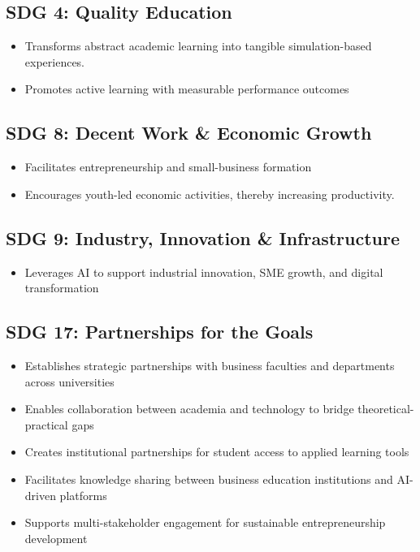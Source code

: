 \documentclass[12pt,letterpaper]{article}
\begin{document}
\subsection{SDG 4: Quality Education}
\begin{itemize}
    \item Transforms abstract academic learning into tangible simulation-based experiences.
    \item Promotes active learning with measurable performance outcomes
\end{itemize}

\subsection{SDG 8: Decent Work \& Economic Growth}
\begin{itemize}
    \item Facilitates entrepreneurship and small-business formation
    \item Encourages youth-led economic activities, thereby increasing productivity.
\end{itemize}

\subsection{SDG 9: Industry, Innovation \& Infrastructure}
\begin{itemize}
    \item Leverages AI to support industrial innovation, SME growth, and digital transformation
\end{itemize}

\subsection{SDG 17: Partnerships for the Goals}
\begin{itemize}
    \item Establishes strategic partnerships with business faculties and departments across universities
    \item Enables collaboration between academia and technology to bridge theoretical-practical gaps
    \item Creates institutional partnerships for student access to applied learning tools
    \item Facilitates knowledge sharing between business education institutions and AI-driven platforms
    \item Supports multi-stakeholder engagement for sustainable entrepreneurship development
\end{itemize}
\end{document}
